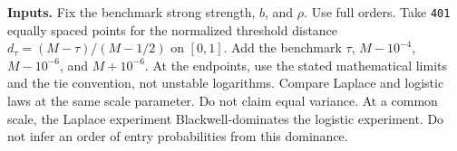 
\textbf{Inputs.} Fix the benchmark strong strength, \(b\), and \(\rho\).
Use full orders.
Take \texttt{401} equally spaced points for the normalized threshold distance
\(d_\tau=(M-\tau)/(M-1/2)\) on \([0,1]\).
Add the benchmark \(\tau\), \(M-10^{-4}\), \(M-10^{-6}\), and \(M+10^{-6}\).
At the endpoints, use the stated mathematical limits and the tie convention, not unstable logarithms.
Compare Laplace and logistic laws at the same scale parameter.
Do not claim equal variance.
At a common scale, the Laplace experiment Blackwell-dominates the logistic experiment.
Do not infer an order of entry probabilities from this dominance.
